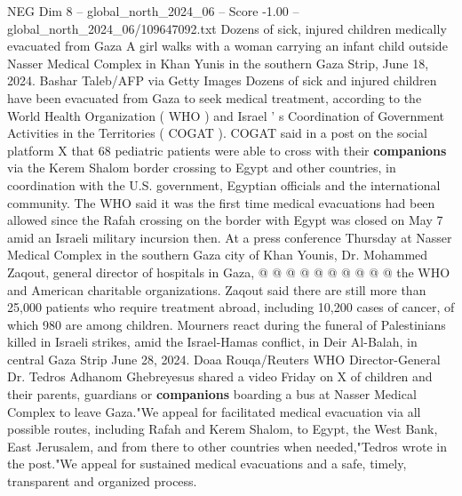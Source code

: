 \begin{textsample}{NEG Dim 8 – global\_north\_2024\_06 – Score -1.00 – global\_north\_2024\_06/109647092.txt}  \label{ex:f8_neg_393}
Dozens of sick, injured children medically evacuated from Gaza A girl walks with a woman carrying an infant child outside Nasser Medical Complex in Khan Yunis in the southern Gaza Strip, June 18, 2024.
Bashar Taleb/AFP via Getty Images Dozens of sick and injured children have been evacuated from Gaza to seek medical treatment, according to the World Health Organization ( WHO ) and Israel ' s Coordination of Government Activities in the Territories ( COGAT ).
COGAT said in a post on the social platform X that 68 pediatric patients were able to cross with their \textbf{companions} via the Kerem Shalom border crossing to Egypt and other countries, in coordination with the U.S. government, Egyptian officials and the international community.
The WHO said it was the first time medical evacuations had been allowed since the Rafah crossing on the border with Egypt was closed on May 7 amid an Israeli military incursion then.
At a press conference Thursday at Nasser Medical Complex in the southern Gaza city of Khan Younis, Dr.
Mohammed Zaqout, general director of hospitals in Gaza, @ @ @ @ @ @ @ @ @ @ the WHO and American charitable organizations.
Zaqout said there are still more than 25,000 patients who require treatment abroad, including 10,200 cases of cancer, of which 980 are among children.
Mourners react during the funeral of Palestinians killed in Israeli strikes, amid the Israel-Hamas conflict, in Deir Al-Balah, in central Gaza Strip June 28, 2024.
Doaa Rouqa/Reuters WHO Director-General Dr.
Tedros Adhanom Ghebreyesus shared a video Friday on X of children and their parents, guardians or \textbf{companions} boarding a bus at Nasser Medical Complex to leave Gaza."We appeal for facilitated medical evacuation via all possible routes, including Rafah and Kerem Shalom, to Egypt, the West Bank, East Jerusalem, and from there to other countries when needed,"Tedros wrote in the post."We appeal for sustained medical evacuations and a safe, timely, transparent and organized process.

\end{textsample}
